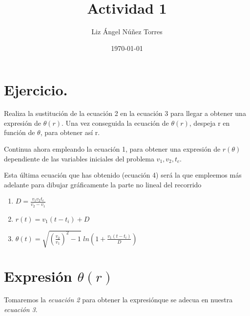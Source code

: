 \documentclass[a4paper,12pt]{article} %
\title{Actividad 1}
\author{Liz Ángel Núñez Torres}
\date{\today}
\begin{document}
\maketitle 


\section{Ejercicio.} %

\begin{justify}
Realiza la sustitución de la ecuación 2 en la ecuación 3 para llegar a obtener una expresión de \(\theta(r)\).
Una vez conseguida la ecuación de \(\theta(r)\), despeja r en función de \(\theta\), para obtener así r.
\end{justify}
\begin{justify}
Continua ahora empleando la ecuación 1, para obtener una expresión de \(r(\theta)\)
dependiente de las variables iniciales del problema \(v_1,v_2,t_c\).
\end{justify}
\begin{justify}
Esta última ecuación que has obtenido (ecuación 4) será la que empleemos más adelante para dibujar gráficamente la parte no lineal del recorrido
\end{justify}

\vspace{\baselineskip}

\begin{enumerate}
    \item \( D = \frac{v_1v_2t_c}{v_2-v_1} \)
    \item \(r\left(t\right)=v_1\left(t-t_i\right) + D \)
    \item \(\theta\left(t\right)=\sqrt{\left(\frac{v_2}{v_1}\right)^2 -1} \; ln\left(1+\frac{v_1\left(t-t_i\right)}{D}\right)\)
\end{enumerate}

\vspace{\baselineskip}

\section{ Expresión \(\theta\left(r\right)\)}

\vspace{\baselineskip}

\begin{justify}
    Tomaremos la \textit{ecuación 2} para obtener la expresiónque se adecua en nuestra \textit{ecuación 3}.
\end{justify}
\end{document}

